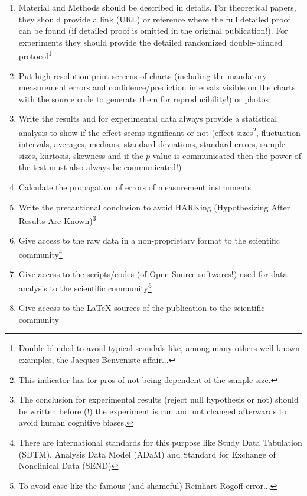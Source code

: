 \begin{enumerate}[label=\protect\circledbullet{\arabic*},leftmargin=15mm]
		\item Material and Methods should be described in details. For theoretical papers, they should provide a link (URL) or reference where the full detailed proof can be found (if detailed proof is omitted in the original publication!). For experiments they should provide the detailed randomized double-blinded protocol\footnote{Double-blinded to avoid typical scandals like, among many others well-known examples, the Jacques Benveniste affair...}
		
		\item Put high resolution print-screens of charts (including the mandatory measurement errors and confidence/prediction intervals visible on the charts with the source code to generate them for reproducibility!) or photos
		
		\item Write the results and for experimental data always provide a statistical analysis to show if the effect seems significant or not (effect sizes\footnote{This indicator has for pros of not being dependent of the sample size.}, fluctuation intervals, averages, medians, standard deviations, standard errors, sample sizes, kurtosis, skewness and if the $p$-value is communicated then the power of the test must also \underline{always} be communicated!)
		
		\item Calculate the propagation of errors of measurement instruments
		
		\item Write the precautional conclusion to avoid HARKing (Hypothesizing After Results Are Known)\footnote{The conclusion for experimental results (reject null hypothesis or not) should be written before (!) the experiment is run and not changed afterwards to avoid human cognitive biases.}
		
		\item Give access to the raw data in a non-proprietary format to the scientific community\footnote{There are international standards for this purpose like Study Data Tabulation (SDTM), Analysis Data Model (ADaM) and Standard for Exchange of Nonclinical Data (SEND)}
		
		\item Give access to the scripts/codes (of Open Source softwares!) used for data analysis to the scientific community\footnote{To avoid case like the famous (and shameful) Reinhart-Rogoff error...}
		
		\item Give access to the \LaTeX{} sources of the publication to the scientific community
		

\end{enumerate}
